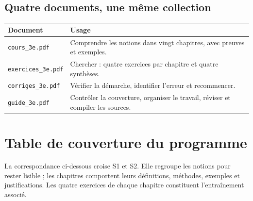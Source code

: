 \documentclass[11pt,a4paper,oneside]{book}
\begin{document}
\section{Quatre documents, une même collection}
\begin{center}
\begin{tabularx}{\textwidth}{lX}
\toprule Document & Usage\\\midrule
\texttt{cours\_3e.pdf} & Comprendre les notions dans vingt chapitres, avec preuves et exemples.\\
\texttt{exercices\_3e.pdf} & Chercher : quatre exercices par chapitre et quatre synthèses.\\
\texttt{corriges\_3e.pdf} & Vérifier la démarche, identifier l'erreur et recommencer.\\
\texttt{guide\_3e.pdf} & Contrôler la couverture, organiser le travail, réviser et compiler les sources.\\\bottomrule
\end{tabularx}
\end{center}
\chapter{Table de couverture du programme}
La correspondance ci-dessous croise S1 et S2. Elle regroupe les notions pour rester lisible ; les chapitres comportent leurs définitions, méthodes, exemples et justifications. Les quatre exercices de chaque chapitre constituent l'entraînement associé.
\end{document}
